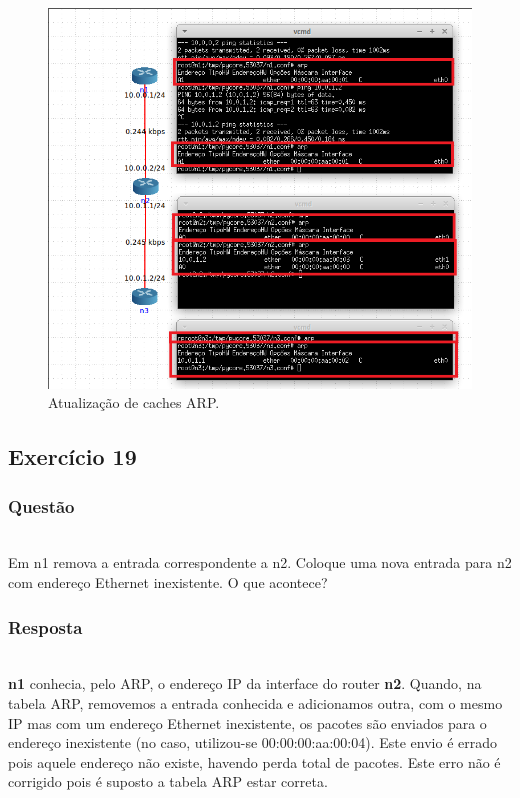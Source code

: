 \documentclass{llncs}
\begin{document}
\begin{figure}
  \begin{center}
    \includegraphics[scale=0.6]{./imagens/5.18.png} 
  \end{center}
  \caption{Atualização de caches ARP.}
  \label{fig:arp_reply_resp}
\end{figure} 

\clearpage
\subsection{Exercício 19}
\subsubsection{Questão}\rule[-10pt]{0pt}{10pt}\\

Em n1 remova a entrada correspondente a n2. Coloque uma nova entrada para n2 com endereço Ethernet inexistente. O que acontece?

\subsubsection{Resposta}\rule[-10pt]{0pt}{10pt}\\

\textbf{n1} conhecia, pelo ARP, o endereço IP da interface do router \textbf{n2}. Quando, na tabela ARP, removemos a entrada conhecida e adicionamos outra, com o mesmo IP mas com um endereço Ethernet inexistente, os pacotes são enviados para o endereço inexistente (no caso, utilizou-se 00:00:00:aa:00:04). Este envio é errado pois aquele endereço não existe, havendo perda total de pacotes. Este erro não é corrigido pois é suposto a tabela ARP estar correta.
\end{document}
